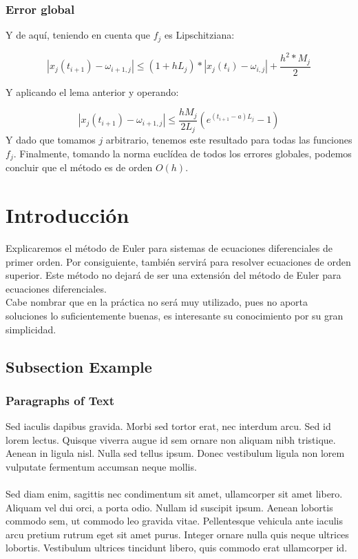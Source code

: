 \documentclass{beamer}
\begin{document}
\begin{frame}
	\frametitle{Error global}
	Y de aquí, teniendo en cuenta que $f_j$ es Lipschitziana:
	
	$$ | x_j(t_{i+1}) - \omega_{i+1,j} | \leq (1+hL_j)*| x_j(t_i) - \omega_{i,j} | + \frac{h^2*M_j}{2} $$
	
	Y aplicando el lema anterior y operando:
	
	$$ | x_j(t_{i+1}) - \omega_{i+1, j} | \leq \frac{hM_j}{2L_j}(e^{(t_{i+1}-a)L_j} - 1) $$
	Y dado que tomamos $j$ arbitrario, tenemos este resultado para todas las funciones $f_j$. Finalmente, tomando la norma euclídea de todos los errores globales, podemos concluir que el método es de orden $O(h)$.
\end{frame}




\section{Introducción} 
 Explicaremos el método de Euler para sistemas de ecuaciones diferenciales de primer orden. Por consiguiente, también servirá para resolver ecuaciones de orden superior. Este método no dejará de ser una extensión del método de Euler para ecuaciones diferenciales. \\
 
 Cabe nombrar que en la práctica no será muy utilizado, pues no aporta soluciones lo suficientemente buenas, es interesante su conocimiento por su gran simplicidad.


\subsection{Subsection Example} %

\begin{frame}
\frametitle{Paragraphs of Text}
Sed iaculis dapibus gravida. Morbi sed tortor erat, nec interdum arcu. Sed id lorem lectus. Quisque viverra augue id sem ornare non aliquam nibh tristique. Aenean in ligula nisl. Nulla sed tellus ipsum. Donec vestibulum ligula non lorem vulputate fermentum accumsan neque mollis.\\~\\

Sed diam enim, sagittis nec condimentum sit amet, ullamcorper sit amet libero. Aliquam vel dui orci, a porta odio. Nullam id suscipit ipsum. Aenean lobortis commodo sem, ut commodo leo gravida vitae. Pellentesque vehicula ante iaculis arcu pretium rutrum eget sit amet purus. Integer ornare nulla quis neque ultrices lobortis. Vestibulum ultrices tincidunt libero, quis commodo erat ullamcorper id.
\end{frame}
\end{document}
